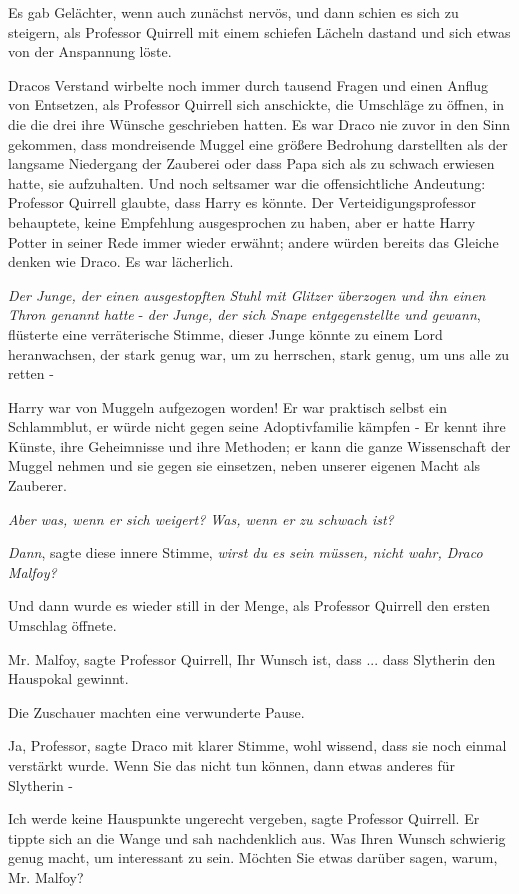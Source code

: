 Es gab Gelächter, wenn auch zunächst nervös, und dann schien es sich zu
steigern, als Professor Quirrell mit einem schiefen Lächeln dastand und sich
etwas von der Anspannung löste.

Dracos Verstand wirbelte noch immer durch tausend Fragen und einen Anflug von
Entsetzen, als Professor Quirrell sich anschickte, die Umschläge zu öffnen, in
die die drei ihre Wünsche geschrieben hatten. Es war Draco nie zuvor in den Sinn
gekommen, dass mondreisende Muggel eine größere Bedrohung darstellten als der
langsame Niedergang der Zauberei oder dass Papa sich als zu schwach erwiesen
hatte, sie aufzuhalten. Und noch seltsamer war die offensichtliche Andeutung:
Professor Quirrell glaubte, dass Harry es könnte. Der Verteidigungsprofessor
behauptete, keine Empfehlung ausgesprochen zu haben, aber er hatte Harry Potter
in seiner Rede immer wieder erwähnt; andere würden bereits das Gleiche denken
wie Draco. Es war lächerlich.

\emph{Der Junge, der einen ausgestopften Stuhl mit Glitzer überzogen und ihn
einen Thron genannt hatte} -\emph{ der Junge, der sich Snape entgegenstellte und
gewann}, flüsterte eine verräterische Stimme, dieser Junge könnte zu einem Lord
heranwachsen, der stark genug war, um zu herrschen, stark genug, um uns alle zu
retten -

Harry war von Muggeln aufgezogen worden! Er war praktisch selbst ein
Schlammblut, er würde nicht gegen seine Adoptivfamilie kämpfen - Er kennt ihre
Künste, ihre Geheimnisse und ihre Methoden; er kann die ganze Wissenschaft der
Muggel nehmen und sie gegen sie einsetzen, neben unserer eigenen Macht als
Zauberer.

\emph{Aber was, wenn er sich weigert? Was, wenn er zu schwach ist?}

\emph{Dann}, sagte diese innere Stimme, \emph{wirst du es sein müssen, nicht
wahr, Draco Malfoy?}

Und dann wurde es wieder still in der Menge, als Professor Quirrell den ersten
Umschlag öffnete.

\glqq{}Mr. Malfoy\grqq{}, sagte Professor Quirrell, \glqq{}Ihr Wunsch ist, dass ...
dass Slytherin den Hauspokal gewinnt.\grqq{}

Die Zuschauer machten eine verwunderte Pause.

\glqq{}Ja, Professor\grqq{}, sagte Draco mit klarer Stimme, wohl wissend, dass
sie noch einmal verstärkt wurde. \glqq{}Wenn Sie das nicht tun können, dann etwas
anderes für Slytherin -\grqq{}

\glqq{}Ich werde keine Hauspunkte ungerecht vergeben\grqq{}, sagte Professor
Quirrell. Er tippte sich an die Wange und sah nachdenklich aus. \glqq{}Was Ihren
Wunsch schwierig genug macht, um interessant zu sein. Möchten Sie etwas darüber
sagen, warum, Mr. Malfoy?\grqq{}

